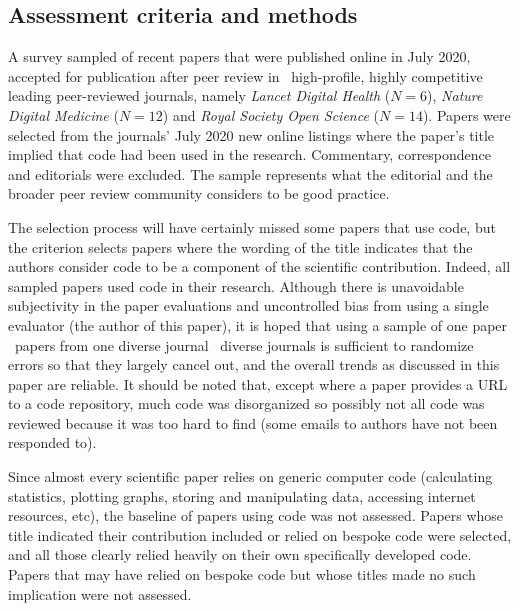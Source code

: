 \documentclass[10pt,a4paper]{article}
\def\plural#1#2{\ifnum #1=1 
	one #2%
\else
	\the#1\ #2s%
\fi}
\def\journalBreakdown{\emph{Lancet Digital Health\/} ($N=6$), \emph{Nature Digital Medicine\/} ($N=12$) and \emph{Royal Society Open Science\/} ($N=14$)}
\begin{document}
\subsection{Assessment criteria and methods}
\label{supplement-data-methods-subsection}
A survey sampled of recent papers that were published online in July 2020, accepted for publication after peer review in \the\numberOfJournals\ high-profile, highly competitive leading peer-reviewed journals, namely \journalBreakdown. Papers were selected from the journals' July 2020 new online listings where the paper's title implied that code had been used in the research. Commentary, correspondence and editorials were excluded. The sample represents what the editorial and the broader peer review community considers to be good practice. 

The selection process will have certainly missed some papers that use code, but the criterion selects papers where the wording of the title indicates that the authors consider code to be a component of the scientific contribution. Indeed, all sampled papers used code in their research. Although there is unavoidable subjectivity in the paper evaluations and uncontrolled bias from using a single evaluator (the author of this paper), it is hoped that using a sample of \plural{\dataN}{paper} from \plural{\numberOfJournals}{diverse journal} is sufficient to randomize errors so that they largely cancel out, and the overall trends as discussed in this paper are reliable. It should be noted that, except where a paper provides a URL to a code repository, much code was disorganized so possibly not all code was reviewed because it was too hard to find (some emails to authors have not been responded to). 
 
Since almost every scientific paper relies on generic computer code (calculating statistics, plotting graphs, storing and manipulating data, accessing internet resources, etc), the baseline of papers using code was not assessed. Papers whose title indicated their contribution included or relied on bespoke code were selected, and all those clearly relied heavily on their own specifically developed code. Papers that may have relied on bespoke code but whose titles made no such implication were not assessed.
\end{document}
